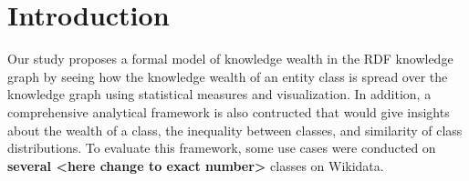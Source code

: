 \section{Introduction}


Our study proposes a formal model of knowledge wealth in the RDF knowledge graph by seeing how the knowledge wealth of an entity class is spread over the knowledge graph using statistical measures and visualization. In addition, a comprehensive analytical framework is also contructed that would give insights about the wealth of a class, the inequality between classes, and similarity of class distributions. To evaluate this framework, some use cases were conducted on \textbf{several <here change to exact number>} classes on Wikidata.